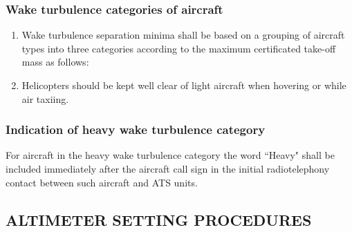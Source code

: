 \documentclass[../vATM.tex]{subfiles}
\begin{document}
    \subsubsection{Wake turbulence categories of aircraft}

    \begin{enumerate}
        \item Wake turbulence separation minima shall be based on a grouping of aircraft types into three categories according to the maximum certificated take-off mass as follows:


        \item Helicopters should be kept well clear of light aircraft when hovering or while air taxiing.


    \end{enumerate}

    \subsubsection{Indication of heavy wake turbulence category}

    For aircraft in the heavy wake turbulence category the word ``Heavy" shall be included immediately after the aircraft call sign in the initial radiotelephony contact between such aircraft and ATS units.


    \subsection[Altimeter setting procedures]{ALTIMETER SETTING PROCEDURES}
\end{document}
